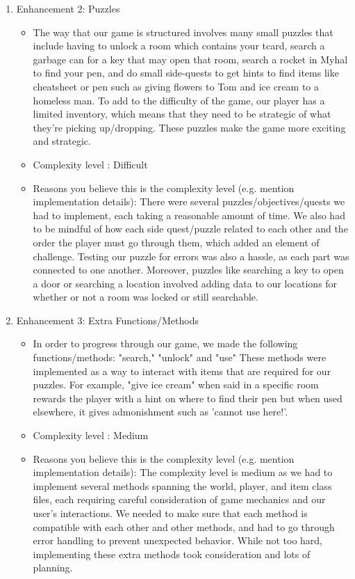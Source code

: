 \documentclass[11pt]{article}
\begin{document}
\begin{enumerate}
\item Enhancement 2: Puzzles
    \begin{itemize}
    \item The way that our game is structured involves many small puzzles that include having to unlock a room which contains your tcard, search a garbage can for a key that may open that room, search a rocket in Myhal to find your pen, and do small side-quests to get hints to find items like cheatsheet or pen such as giving flowers to Tom and ice cream to a homeless man. To add to the difficulty of the game, our player has a limited inventory, which means that they need to be strategic of what they're picking up/dropping. These puzzles make the game more exciting and strategic.


    \item Complexity level : Difficult
    \item Reasons you believe this is the complexity level (e.g. mention implementation details):
    There were several puzzles/objectives/quests we had to implement, each taking a reasonable amount of time. We also had to be mindful of how each side quest/puzzle related to each other and the order the player must go through them, which added an element of challenge. Testing our puzzle for errors was also a hassle, as each part was connected to one another. Moreover, puzzles like searching a key to open a door or searching a location involved adding data to our locations for whether or not a room was locked or still searchable.
    \end{itemize}

\item Enhancement 3: Extra Functions/Methods
    \begin{itemize}
    \item In order to progress through our game, we made the following functions/methods: "search," "unlock" and "use" These methods were implemented as a way to interact with items that are required for our puzzles. For example, "give ice cream" when said in a specific room rewards the player with a hint on where to find their pen but when used elsewhere, it gives admonishment such as 'cannot use here!'.

    \item Complexity level : Medium
    \item Reasons you believe this is the complexity level (e.g. mention implementation details):
    The complexity level is medium as we had to implement several methods spanning the world, player, and item class files, each requiring careful consideration of game mechanics and our user's interactions. We needed to make sure that each method is compatible with each other and other methods, and had to go through error handling to prevent unexpected behavior. While not too hard, implementing these extra methods took consideration and lots of planning.
 

\end{itemize}
\end{enumerate}
\end{document}
